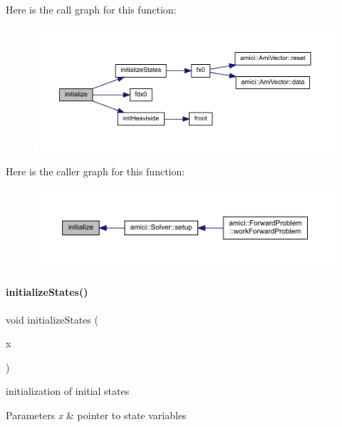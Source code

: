 Here is the call graph for this function\+:
\nopagebreak
\begin{figure}[H]
\begin{center}
\leavevmode
\includegraphics[width=350pt]{classamici_1_1_model_a4d8f308f15a126dde571f2e26787d3e8_cgraph}
\end{center}
\end{figure}
Here is the caller graph for this function\+:
\nopagebreak
\begin{figure}[H]
\begin{center}
\leavevmode
\includegraphics[width=350pt]{classamici_1_1_model_a4d8f308f15a126dde571f2e26787d3e8_icgraph}
\end{center}
\end{figure}
\mbox{\label{classamici_1_1_model_a73d147a7108479e20833ba816cac0f6b}} 
\paragraph{\texorpdfstring{initialize\+States()}{initializeStates()}}
{\footnotesize\ttfamily void initialize\+States (\begin{DoxyParamCaption}\item[{\mbox{\hyperlink{classamici_1_1_ami_vector}{Ami\+Vector}} $\ast$}]{x }\end{DoxyParamCaption})}

initialization of initial states 
\begin{DoxyParams}{Parameters}
{\em x} & pointer to state variables \\
\hline
\end{DoxyParams}


